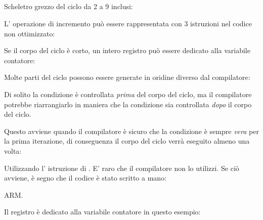 ﻿%
\subsection{\Conclusion{}}

Scheletro grezzo del ciclo da 2 a 9 inclusi:



L' operazione di incremento può essere rappresentata con 3 istruzioni nel codice non ottimizzato:



Se il corpo del ciclo è corto, un intero registro può essere dedicato alla variabile contatore:



Molte parti del ciclo possono essere generate in oridine diverso dal compilatore:



Di solito la condizione è controllata \emph{prima} del corpo del ciclo, ma il compilatore potrebbe riarrangiarlo in maniera che la condizione sia controllata 
\emph{dopo} il corpo del ciclo.

Questo avviene quando il compilatore è sicuro che la condizione è sempre \emph{vera} per la prima iterazione, 
di conseguenza il corpo del ciclo verrà eseguito almeno una volta:




Utilizzando l' istruzione di . E' raro che il compilatore non lo utilizzi.
Se ciò avviene, è segno che il codice è stato scritto a mano:



ARM. 

Il registro  è dedicato alla variabile contatore in questo esempio:




